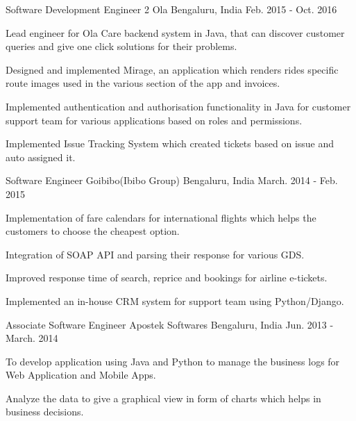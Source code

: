 \begin{cventries}
  \cventry
    {Software Development Engineer 2} %
    {Ola} %
    {Bengaluru, India} %
    {Feb. 2015 - Oct. 2016} %
    {
      \begin{cvitems} %
        \item {Lead engineer for Ola Care backend system in Java, that can discover customer queries and give one click solutions for their problems.}
        \item {Designed and implemented Mirage, an application which renders rides specific route images used in the various section of the app and invoices.}
        \item {Implemented authentication and authorisation functionality in Java for customer support team for various applications based on roles and permissions.}
        \item {Implemented Issue Tracking System which created tickets based on issue and auto assigned it.}
      \end{cvitems}
    }
  \cventry
    {Software Engineer} %
    {Goibibo(Ibibo Group)} %
    {Bengaluru, India} %
    {March. 2014 - Feb. 2015} %
    {
      \begin{cvitems} %
        \item {Implementation of fare calendars for international flights which helps the customers to choose the cheapest option.}
        \item {Integration of SOAP API and parsing their response for various GDS.}
        \item {Improved response time of search, reprice and bookings for airline e-tickets.}
        \item {Implemented an in-house CRM system for support team using Python/Django.}
      \end{cvitems}
    }

  \cventry
    {Associate Software Engineer} %
    {Apostek Softwares} %
    {Bengaluru, India} %
    {Jun. 2013 - March. 2014} %
    {
      \begin{cvitems} %
        \item {To develop application using Java and Python to manage the business logs for Web Application and Mobile Apps.}
        \item {Analyze the data to give a graphical view in form of charts which helps in business decisions.}
      \end{cvitems}
    }
\end{cventries}
